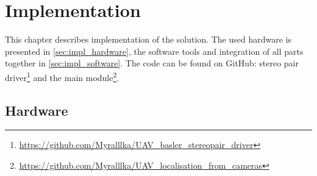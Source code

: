 \chapter{Implementation}
\label{chapter:implementation}

This chapter describes implementation of the solution.
The used hardware is presented in \autoref{sec:impl_hardware}, the software tools and integration of all parts together in \autoref{sec:impl_software}. The code can be found on GitHub: stereo pair driver\footnote{\url{https://github.com/Myralllka/UAV_basler_stereopair_driver}} and the main module\footnote{\url{https://github.com/Myralllka/UAV_localisation_from_cameras}}.

\section{Hardware}
\label{sec:impl_hardware}
